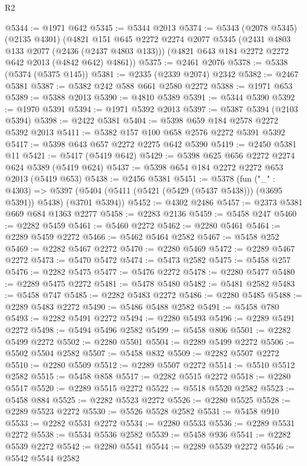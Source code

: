 \begin{lexlean}{R2}
\begin{coremodule}
@5344 := @1971 @642
@5345 := @5344 @2013
@5374 := @5343
    (@2078 @5345)
    (@2135 @4301)
    (@4821
      @151
      @645
      @2272
      @2274
      @2077
      @5345
      (@2431 @4803 @133 @2077 (@2436 (@2437 @4803 @133)))
      (@4821 @643 @184 @2272 @2272 @642 @2013 (@4842 @642) @4861))
@5375 := @2461 @2076
@5378 := @5338 (@5374 (@5375 @145))
@5381 := @2335 (@2339 @2074) @2342
@5382 := @2467 @5381
@5387 := @5382 @242 @588 @661 @2580 @2272
@5388 := @1971 @653
@5389 := @5388 @2013
@5390 := @4810 @5389
@5391 := @5344 @5390
@5392 := @1970 @5391
@5394 := @1971 @5392 @2013
@5397 := @5387 @5394 (@2103 @5394)
@5398 := @2422 @5381
@5404 := @5398 @659 @184 @2578 @2272 @5392 @2013
@5411 := @5382 @157 @100 @658 @2576 @2272 @5391 @5392
@5417 := @5398 @643 @657 @2272 @2275 @642 @5390
@5419 := @2450 @5381 @11
@5421 := @5417 (@5419 @642)
@5429 := @5398 @625 @656 @2272 @2274 @624 @5389 (@5419 @624)
@5437 := @5398 @654 @184 @2272 @2272 @653 @2013 (@5419 @653)
@5438 := @2456 @5381
@5451 := @5378
    (fun ("_" : @4303) =>
    @5397 (@5404 (@5411 (@5421 (@5429 (@5437 @5438))) (@3695 @5391)) @5438) (@3701 @5394))
@5452 := @4302 @2486
@5457 := @2373 @5381 @669 @684 @1363 @2277
@5458 := @2283 @2136
@5459 := @5458 @247
@5460 := @2282 @5459
@5461 := @5460 @2272
@5462 := @2280 @5461
@5464 := @2289 @5459 @2272
@5466 := @5462 @5464 @2582
@5467 := @5458 @252
@5469 := @2282 @5467 @2272
@5470 := @2280 @5469
@5472 := @2289 @5467 @2272
@5473 := @5470 @5472
@5474 := @5473 @2582
@5475 := @5458 @257
@5476 := @2282 @5475
@5477 := @5476 @2272
@5478 := @2280 @5477
@5480 := @2289 @5475 @2272
@5481 := @5478 @5480
@5482 := @5481 @2582
@5483 := @5458 @747
@5485 := @2282 @5483 @2272
@5486 := @2280 @5485
@5488 := @2289 @5483 @2272
@5490 := @5486 @5488 @2582
@5491 := @5458 @780
@5493 := @2282 @5491 @2272
@5494 := @2280 @5493
@5496 := @2289 @5491 @2272
@5498 := @5494 @5496 @2582
@5499 := @5458 @806
@5501 := @2282 @5499 @2272
@5502 := @2280 @5501
@5504 := @2289 @5499 @2272
@5506 := @5502 @5504 @2582
@5507 := @5458 @832
@5509 := @2282 @5507 @2272
@5510 := @2280 @5509
@5512 := @2289 @5507 @2272
@5514 := @5510 @5512 @2582
@5515 := @5458 @858
@5517 := @2282 @5515 @2272
@5518 := @2280 @5517
@5520 := @2289 @5515 @2272
@5522 := @5518 @5520 @2582
@5523 := @5458 @884
@5525 := @2282 @5523 @2272
@5526 := @2280 @5525
@5528 := @2289 @5523 @2272
@5530 := @5526 @5528 @2582
@5531 := @5458 @910
@5533 := @2282 @5531 @2272
@5534 := @2280 @5533
@5536 := @2289 @5531 @2272
@5538 := @5534 @5536 @2582
@5539 := @5458 @936
@5541 := @2282 @5539 @2272
@5542 := @2280 @5541
@5544 := @2289 @5539 @2272
@5546 := @5542 @5544 @2582

\end{coremodule}
\end{lexlean}
